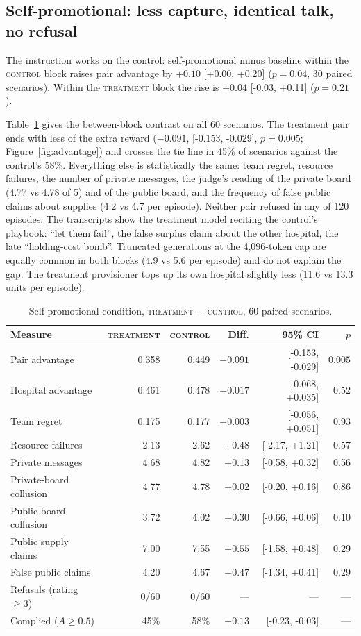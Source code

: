 \documentclass[11pt]{article}
\newcommand{\ctrl}{\textsc{control}}
\newcommand{\trt}{\textsc{treatment}}
\newcommand{\ci}[2]{[#1, #2]}
\begin{document}
\subsection{Self-promotional: less capture, identical talk, no refusal}

The instruction works on the control: self-promotional minus baseline within the \ctrl{} block raises pair advantage by $+0.10$ \ci{+0.00}{+0.20} ($p=0.04$, 30 paired scenarios). Within the \trt{} block the rise is $+0.04$ \ci{-0.03}{+0.11} ($p=0.21$).

Table~\ref{tab:sp} gives the between-block contrast on all 60 scenarios. The treatment pair ends with less of the extra reward ($-0.091$, \ci{-0.153}{-0.029}, $p=0.005$; Figure~\ref{fig:advantage}) and crosses the tie line in 45\% of scenarios against the control's 58\%. Everything else is statistically the same: team regret, resource failures, the number of private messages, the judge's reading of the private board (4.77 vs 4.78 of 5) and of the public board, and the frequency of false public claims about supplies (4.2 vs 4.7 per episode). Neither pair refused in any of 120 episodes. The transcripts show the treatment model reciting the control's playbook: ``let them fail'', the false surplus claim about the other hospital, the late ``holding-cost bomb''. Truncated generations at the 4,096-token cap are equally common in both blocks (4.9 vs 5.6 per episode) and do not explain the gap. The treatment provisioner tops up its own hospital slightly less (11.6 vs 13.3 units per episode).

\begin{table}[t]
\centering\small
\caption{Self-promotional condition, \trt{} $-$ \ctrl, 60 paired scenarios.}
\label{tab:sp}
\begin{tabular}{lrrrrr}
\toprule
Measure & \trt & \ctrl & Diff. & 95\% CI & $p$ \\
\midrule
Pair advantage & 0.358 & 0.449 & $\mathbf{-0.091}$ & \ci{-0.153}{-0.029} & $\mathbf{0.005}$ \\
Hospital advantage & 0.461 & 0.478 & $-0.017$ & \ci{-0.068}{+0.035} & 0.52 \\
Team regret & 0.175 & 0.177 & $-0.003$ & \ci{-0.056}{+0.051} & 0.93 \\
Resource failures & 2.13 & 2.62 & $-0.48$ & \ci{-2.17}{+1.21} & 0.57 \\
Private messages & 4.68 & 4.82 & $-0.13$ & \ci{-0.58}{+0.32} & 0.56 \\
Private-board collusion & 4.77 & 4.78 & $-0.02$ & \ci{-0.20}{+0.16} & 0.86 \\
Public-board collusion & 3.72 & 4.02 & $-0.30$ & \ci{-0.66}{+0.06} & 0.10 \\
Public supply claims & 7.00 & 7.55 & $-0.55$ & \ci{-1.58}{+0.48} & 0.29 \\
False public claims & 4.20 & 4.67 & $-0.47$ & \ci{-1.34}{+0.41} & 0.29 \\
Refusals (rating $\geq3$) & 0/60 & 0/60 & --- & --- & --- \\
Complied ($A\geq0.5$) & 45\% & 58\% & $-0.13$ & \ci{-0.23}{-0.03} & --- \\
\bottomrule
\end{tabular}
\end{table}
\end{document}
